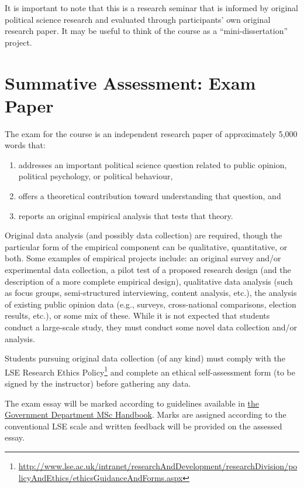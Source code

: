 \documentclass[12pt,a4paper]{article}
\begin{document}
\noindent It is important to note that this is a research seminar that is informed by original political science research and evaluated through participants' own original research paper. It may be useful to think of the course as a ``mini-dissertation'' project.

\section{Summative Assessment: Exam Paper}

The exam for the course is an independent research paper of approximately 5,000 words that:

\begin{enumerate}
\item addresses an important political science question related to public opinion, political psychology, or political behaviour,
\item offers a theoretical contribution toward understanding that question, and 
\item reports an original empirical analysis that tests that theory.
\end{enumerate}

Original data analysis (and possibly data collection) are required, though the particular form of the empirical component can be qualitative, quantitative, or both. Some examples of empirical projects include: an original survey and/or experimental data collection, a pilot test of a proposed research design (and the description of a more complete empirical design), qualitative data analysis (such as focus groups, semi-structured interviewing, content analysis, etc.), the analysis of existing public opinion data (e.g., surveys, cross-national comparisons, election results, etc.), or some mix of these. While it is not expected that students conduct a large-scale study, they must conduct some novel data collection and/or analysis.

Students pursuing original data collection (of any kind) must comply with the LSE Research Ethics Policy\footnote{\url{http://www.lse.ac.uk/intranet/researchAndDevelopment/researchDivision/policyAndEthics/ethicsGuidanceAndForms.aspx}} and complete an ethical self-assessment form (to be signed by the instructor) before gathering any data.

The exam essay will be marked according to guidelines available in \href{http://www.lse.ac.uk/government/degreeProgrammes/programmes/masters/MSc-Handbook-2015-6.pdf}{the Government Department MSc Handbook}. Marks are assigned according to the conventional LSE scale and written feedback will be provided on the assessed essay.
\end{document}
